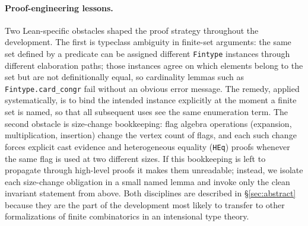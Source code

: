 \documentclass{article}
\newcommand{\lean}[1]{\texttt{#1}}
\begin{document}
\paragraph{Proof-engineering lessons.}
Two Lean-specific obstacles shaped the proof strategy throughout the
development.  The first is typeclass ambiguity in finite-set arguments: the
same set defined by a predicate can be assigned different \lean{Fintype}
instances through different elaboration paths; those instances agree on which
elements belong to the set but are not definitionally equal, so cardinality
lemmas such as \lean{Fintype.card\_congr} fail without an obvious error
message.  The remedy, applied systematically, is to bind the intended instance
explicitly at the moment a finite set is named, so that all subsequent uses
see the same enumeration term.  The second obstacle is size-change bookkeeping:
flag algebra operations (expansion, multiplication, insertion) change the
vertex count of flags, and each such change forces explicit cast evidence and
heterogeneous equality (\lean{HEq}) proofs whenever the same flag is used at
two different sizes.  If this bookkeeping is left to propagate through
high-level proofs it makes them unreadable; instead, we isolate each
size-change obligation in a small named lemma and invoke only the clean
invariant statement from above.  Both disciplines are described in
\S\ref{sec:abstract} because they are the part of the development most likely
to transfer to other formalizations of finite combinatorics in an intensional
type theory.
\end{document}
